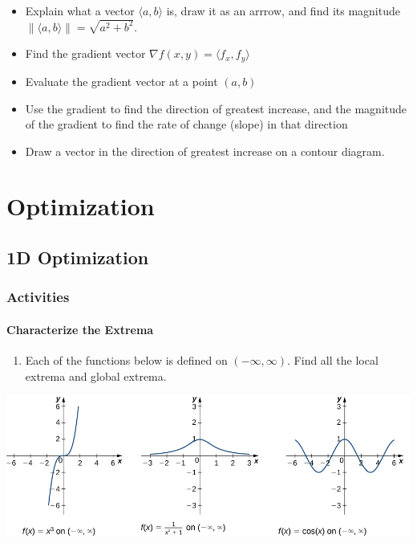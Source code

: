 \documentclass[
]{book}
\providecommand{\tightlist}{%
  \setlength{\itemsep}{0pt}\setlength{\parskip}{0pt}}
\begin{document}
\begin{itemize}
\tightlist
\item
  Explain what a vector \(\langle a, b \rangle\) is, draw it as an arrrow, and find its magnitude \(\| \langle a, b \rangle \| = \sqrt{a^2+b^2}.\)
\item
  Find the gradient vector \(\nabla f(x,y) = \langle f_x, f_y \rangle\)
\item
  Evaluate the gradient vector at a point \((a,b)\)
\item
  Use the gradient to find the direction of greatest increase, and the magnitude of the gradient to find the rate of change (slope) in that direction
\item
  Draw a vector in the direction of greatest increase on a contour diagram.
\end{itemize}

\hypertarget{part-optimization}{%
\part{Optimization}\label{part-optimization}}

\hypertarget{d-optimization}{%
\chapter{1D Optimization}\label{d-optimization}}

\hypertarget{activities-17}{%
\section{Activities}\label{activities-17}}

\hypertarget{characterize-the-extrema}{%
\subsection{Characterize the Extrema}\label{characterize-the-extrema}}

\begin{enumerate}
\def\labelenumi{\arabic{enumi}.}
\tightlist
\item
  Each of the functions below is defined on \((-\infty, \infty)\). Find all the local extrema and global extrema.
\end{enumerate}

\includegraphics[width=1\textwidth,height=\textheight]{images/minmax-ex1.png}
\end{document}
